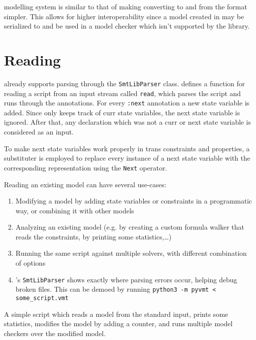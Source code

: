 \pyvmt{} modelling system is similar to that of \vmtlib{} making converting to and from the format simpler.
This allows for higher interoperability since a model created in \pyvmt{} may be serialized to \vmtlib{} and be used in a model checker which isn't supported by the library.

\section{Reading}
\pysmt{} already supports parsing \smtlib{} through the \texttt{SmtLibParser} class.
\pyvmt{} defines a function for reading a script from an input stream called \texttt{read}, which parses the script and runs through the annotations.
For every \texttt{:next} annotation a new state variable is added. Since \pyvmt{} only keeps track of curr state variables, the next state variable is ignored.
After that, any declaration which was not a curr or next state variable is considered as an input.

To make next state variables work properly in trans constraints and properties, a substituter is employed to replace every instance of a next state variable with the corresponding representation using the \texttt{Next} operator.

Reading an existing \vmtlib{} model can have several use-cases:
\begin{enumerate}
    \item Modifying a model by adding state variables or constraints in a programmatic way, or combining it with other models
    \item Analyzing an existing model (e.g. by creating a custom formula walker that reads the constraints, by printing some statistics,\dots)
    \item Running the same \vmtlib{} script against multiple solvers, with different combination of options
    \item \pysmt{}'s \texttt{SmtLibParser} shows exactly where parsing errors occur, helping debug broken \vmtlib{} files. This can be demoed by running \texttt{python3 -m pyvmt < some_script.vmt}
\end{enumerate}

\begin{listing}
    \label{alg:reading-vmtlib}
    \caption{A simple script which reads a \vmtlib{} model from the standard input, prints some statistics, modifies the model by adding a counter, and runs multiple model checkers over the modified model.}
\end{listing}

